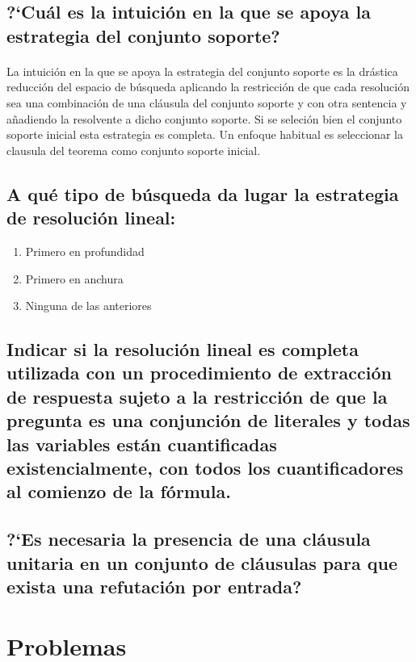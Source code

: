 \documentclass[10pt, a4paper,spanish]{article}
\begin{document}
		\subsection{?`Cuál es la intuición en la que se apoya la estrategia del conjunto soporte?}

			\paragraph{}
			La intuición en la que se apoya la estrategia del conjunto soporte es la drástica reducción del espacio de búsqueda aplicando la restricción de que cada resolución sea una combinación de una cláusula del conjunto soporte y con otra sentencia y añadiendo la resolvente a dicho conjunto soporte. Si se seleción bien el conjunto soporte inicial esta estrategia es completa. Un enfoque habitual es seleccionar la clausula del teorema como conjunto soporte inicial.


		\subsection{A qué tipo de búsqueda da lugar la estrategia de resolución lineal:}

			\begin{enumerate}[label=\Alph*)]
				\item Primero en profundidad
				\item Primero en anchura
				\item Ninguna de las anteriores
			\end{enumerate}

			\paragraph{}


		\subsection{Indicar si la resolución lineal es completa utilizada con un procedimiento de extracción de respuesta sujeto a la restricción de que la pregunta es una conjunción de literales y todas las variables están cuantificadas existencialmente, con todos los cuantificadores al comienzo de la fórmula.}
			\paragraph{}


		\subsection{?`Es necesaria la presencia de una cláusula unitaria en un conjunto de cláusulas para que exista una refutación por entrada?}

			\paragraph{}


	\section{Problemas}
\end{document}
